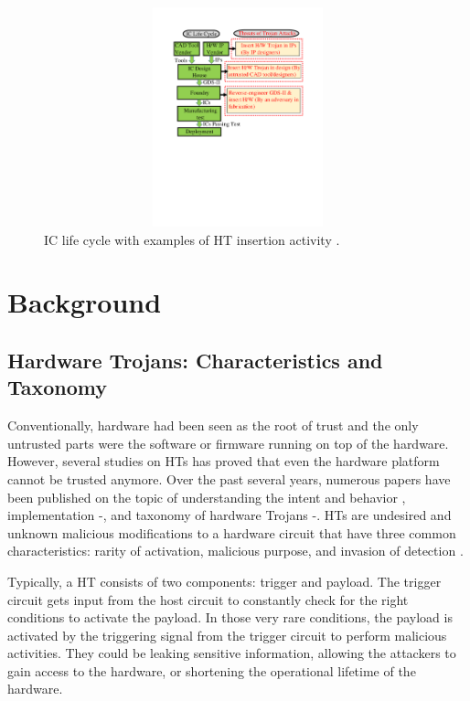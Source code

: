 \documentclass[journal]{IEEEtran}
\begin{document}
\begin{figure}[tb]	
	\centering
	\includegraphics[viewport=0.75in 4.4in 18in 10in, clip,height=2.5in,width=9in,scale=0.5]{figure/HT_attack_model.pdf}
	\caption{IC life cycle with examples of HT insertion activity \cite{bhunia2014hardware}.}%
	\label{fig:adversaries}	
\end{figure}
\section{Background}\label{background}
\subsection{Hardware Trojans: Characteristics and Taxonomy}
 Conventionally, hardware had been seen as the root of trust and the only untrusted parts were the software or firmware running on top of the hardware. However, several studies on HTs has proved that even the hardware platform cannot be trusted anymore.  Over the past several years, numerous papers have been published on the topic of understanding the intent and behavior \cite{chakraborty2009hardware,bhunia2014hardware}, implementation \cite{zhang2014detrust}\nocite{chen2008hardware,chakraborty2013hardware}-\cite{shakya2017benchmarking}, and taxonomy of hardware Trojans \cite{shakya2017benchmarking}\nocite{tehranipoor2010survey}-\cite{karri2010trustworthy}. HTs are undesired and unknown malicious modifications to a hardware circuit that have three common characteristics: rarity of activation, malicious purpose, and invasion of detection \cite{bhunia2014hardware}. 
 
 Typically, a HT consists of two components: trigger and payload. The trigger circuit gets input from the host circuit to constantly check for the right conditions to activate the payload. In those very rare conditions, the payload is activated by the triggering signal from the trigger circuit to perform malicious activities. They could be leaking sensitive information, allowing the attackers to gain access to the hardware, or shortening the operational lifetime of the hardware.
\end{document}

